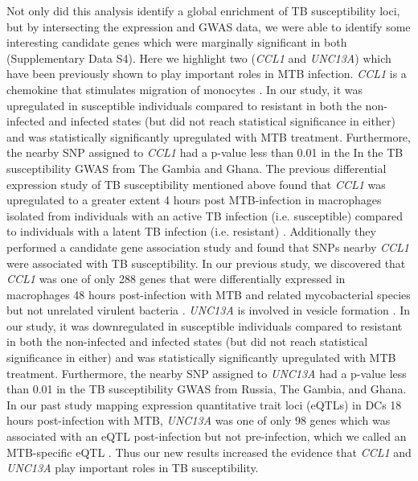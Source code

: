 \documentclass[fleqn,10pt]{wlscirep}
\begin{document}
Not only did this analysis identify a global enrichment of TB
susceptibility loci, but by intersecting the expression and GWAS data,
we were able to identify some interesting candidate genes  which were
marginally significant in both (Supplementary Data S4). Here we
highlight two (\emph{CCL1} and \emph{UNC13A}) which have been
previously shown to play important roles in MTB infection. \emph{CCL1}
is a chemokine that stimulates migration of monocytes
\cite{Miller1992}. In our study, it was upregulated in susceptible
individuals compared to resistant in both the non-infected and
infected states (but did not reach statistical significance in either)
and was statistically significantly upregulated with MTB treatment.
Furthermore, the nearby SNP assigned to \emph{CCL1} had a p-value less
than 0.01 in the In the TB susceptibility GWAS from The Gambia and
Ghana. The previous differential expression study of TB susceptibility
mentioned above found that \emph{CCL1} was upregulated to a greater
extent 4 hours post MTB-infection in macrophages isolated from
individuals with an active TB infection (i.e. susceptible) compared to
individuals with a latent TB infection (i.e. resistant)
\cite{Thuong2008}. Additionally they performed a candidate gene
association study and found that SNPs nearby \emph{CCL1} were
associated with TB susceptibility. In our previous study, we
discovered that \emph{CCL1} was one of only 288 genes that were
differentially expressed in macrophages 48 hours post-infection with
MTB and related mycobacterial species but not unrelated virulent
bacteria \cite{Blischak2015}. \emph{UNC13A} is involved in vesicle
formation \cite{Sudhof2004}. In our study, it was downregulated in
susceptible individuals compared to resistant in both the non-infected
and infected states (but did not reach statistical significance in
either) and was statistically significantly upregulated with MTB
treatment. Furthermore, the nearby SNP assigned to \emph{UNC13A} had a
p-value less than 0.01 in the TB susceptibility GWAS from Russia, The
Gambia, and Ghana. In our past study mapping expression quantitative
trait loci (eQTLs) in DCs 18 hours post-infection with MTB,
\emph{UNC13A} was one of only 98 genes which was associated with an
eQTL post-infection but not pre-infection, which we called an
MTB-specific eQTL \cite{Barreiro2012}. Thus our new results increased
the evidence that \emph{CCL1} and \emph{UNC13A} play important roles
in TB susceptibility.
\end{document}
